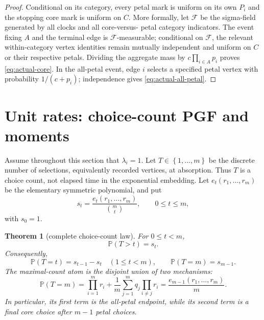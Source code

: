 \documentclass[10pt,a4paper]{amsart}
\newcommand{\PP}{\mathbb P}
\newcommand{\set}[1]{\left\{#1\right\}}
\newtheorem{theorem}{Theorem}[section]
\begin{document}
\begin{proof}
Conditional on its category, every petal mark is uniform on its own $P_i$
and the stopping core mark is uniform on $C$.  More formally, let
$\mathcal F$ be the sigma-field generated by all clocks and all core-versus-
petal category indicators.  The event fixing $A$ and the terminal edge is
$\mathcal F$-measurable; conditional on $\mathcal F$, the relevant
within-category vertex identities remain mutually independent and uniform on
$C$ or their respective petals.  Dividing the aggregate mass by
$c\prod_{i\in A}p_i$ proves \eqref{eq:actual-core}.  In the all-petal event,
edge $i$ selects a specified petal vertex with probability $1/(c+p_i)$;
independence gives \eqref{eq:actual-all-petal}.
\end{proof}

\section{Unit rates: choice-count PGF and moments}

Assume throughout this section that $\lambda_i=1$.  Let $T\in\set{1,\ldots,m}$
be the discrete number of selections, equivalently recorded vertices, at
absorption.  Thus $T$ is a choice count, not elapsed time in the exponential
embedding.  Let $e_t(r_1,\ldots,r_m)$ be the elementary symmetric polynomial,
and put
\begin{equation}\label{eq:st}
 s_t=\frac{e_t(r_1,\ldots,r_m)}{\binom mt},\qquad 0\leq t\leq m,
\end{equation}
with $s_0=1$.

\begin{theorem}[complete choice-count law]\label{thm:stopping}
For $0\leq t<m$,
\begin{equation}\label{eq:tail}
 \PP(T>t)=s_t.
\end{equation}
Consequently,
\begin{equation}\label{eq:mass}
 \PP(T=t)=s_{t-1}-s_t\quad(1\leq t<m),
 \qquad
 \PP(T=m)=s_{m-1}.
\end{equation}
The maximal-count atom is the disjoint union of two mechanisms:
\begin{equation}\label{eq:top-atom}
 \PP(T=m)
 =\prod_{i=1}^m r_i
  +\frac1m\sum_{j=1}^m q_j\prod_{i\ne j}r_i
 =\frac{e_{m-1}(r_1,\ldots,r_m)}{m}.
\end{equation}
In particular, its first term is the all-petal endpoint, while its second term
is a final core choice after $m-1$ petal choices.
\end{theorem}
\end{document}
